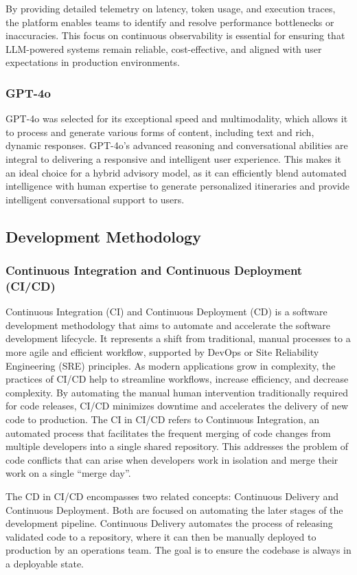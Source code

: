 By providing detailed telemetry on latency, token usage, and execution traces, the platform enables teams to identify and resolve performance bottlenecks or inaccuracies. This focus on continuous observability is essential for ensuring that LLM-powered systems remain reliable, cost-effective, and aligned with user expectations in production environments.

\subsubsection{GPT-4o}
GPT-4o \cite{openai2025models} was selected for its exceptional speed and multimodality, which allows it to process and generate various forms of content, including text and rich, dynamic responses. GPT-4o's advanced reasoning and conversational abilities are integral to delivering a responsive and intelligent user experience. This makes it an ideal choice for a hybrid advisory model, as it can efficiently blend automated intelligence with human expertise to generate personalized itineraries and provide intelligent conversational support to users.
\subsection{Development Methodology}
\subsubsection{Continuous Integration and Continuous Deployment (CI/CD)}
Continuous Integration (CI) and Continuous Deployment (CD) \cite{redhat2023cicd} is a software development methodology that aims to automate and accelerate the software development lifecycle. It represents a shift from traditional, manual processes to a more agile and efficient workflow, supported by DevOps or Site Reliability Engineering (SRE) principles. As modern applications grow in complexity, the practices of CI/CD help to streamline workflows, increase efficiency, and decrease complexity. By automating the manual human intervention traditionally required for code releases, CI/CD minimizes downtime and accelerates the delivery of new code to production.
The CI in CI/CD refers to Continuous Integration, an automated process that facilitates the frequent merging of code changes from multiple developers into a single shared repository. This addresses the problem of code conflicts that can arise when developers work in isolation and merge their work on a single ``merge day''.

The CD in CI/CD encompasses two related concepts: Continuous Delivery and Continuous Deployment. Both are focused on automating the later stages of the development pipeline. Continuous Delivery automates the process of releasing validated code to a repository, where it can then be manually deployed to production by an operations team. The goal is to ensure the codebase is always in a deployable state.

